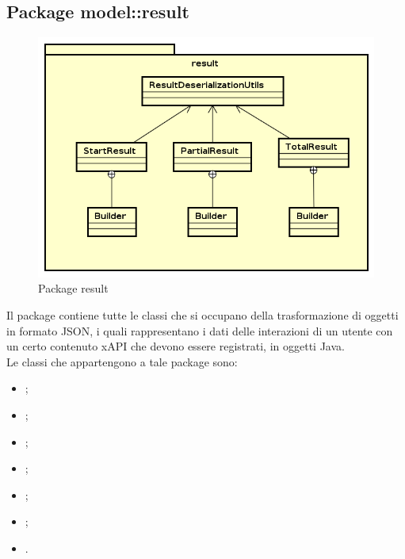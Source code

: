 \documentclass[../Tesi.tex]{subfiles}
\begin{document}
	\subsection{Package model::result}
		\begin{figure}[H]
			\centering
			\includegraphics[scale=0.6]{images/package_diagrams/result}
				\caption{Package result}
		\end{figure}
		Il package  contiene tutte le classi che si occupano della trasformazione di oggetti in formato JSON, i quali rappresentano i dati delle interazioni di un utente con un certo contenuto xAPI che devono essere registrati, in oggetti Java. \\
		Le classi che appartengono a tale package sono:
		\begin{itemize}
			\item {};
			\item {};
			\item {};
			\item {};
			\item {};
			\item {};
			\item {}.
		\end{itemize}
\end{document}

